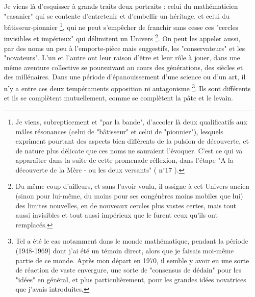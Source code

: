 Je viens là d'esquisser à grands traits deux portraits : celui du mathématicien "casanier" qui se contente d'entretenir et d'embellir un héritage, et celui du bâtisseur-pionnier \footnote{Je viens, subrepticement et "par la bande", d'accoler là deux qualificatifs aux mâles résonances (celui de "bâtisseur" et celui de "pionnier"), lesquels expriment pourtant des aspects bien différents de la pulsion de découverte, et de nature plus délicate que ces noms ne sauraient l'évoquer. C'est ce qui va apparaître dans la suite de cette promenade-réflexion, dans l'étape "A la découverte de la Mère - ou les deux versants" ( $\mathrm{n}^{\circ} 17$ ).}, qui ne peut s'empêcher de franchir sans cesse ces "cercles invisibles et impérieux" qui délimitent un Univers \footnote{Du même coup d'ailleurs, et sans l'avoir voulu, il assigne à cet Univers ancien (sinon pour lui-même, du moins pour ses congénères moins mobiles que lui) des limites nouvelles, en de nouveaux cercles plus vastes certes, mais tout aussi invisibles et tout aussi impérieux que le furent ceux qu'ils ont remplacés.}. On peut les appeler aussi, par des noms un peu à l'emporte-pièce mais suggestifs, les "conservateurs" et les "novateurs". L'un et l'autre ont leur raison d'être et leur rôle à jouer, dans une même aventure collective se poursuivant au cours des générations, des siècles et des millénaires. Dans une période d'épanouissement d'une science ou d'un art, il n'y a entre ces deux tempéraments opposition ni antagonisme \footnote{Tel a été le cas notamment dans le monde mathématique, pendant la période (1948-1969) dont j'ai été un témoin direct, alors que je faisais moi-même partie de ce monde. Après mon départ en 1970, il semble y avoir eu une sorte de réaction de vaste envergure, une sorte de "consensus de dédain" pour les "idées" en général, et plus particulièrement, pour les grandes idées novatrices que j'avais introduites.}. Ils sont différents et ils se complètent mutuellement, comme se complètent la pâte et le levain.

